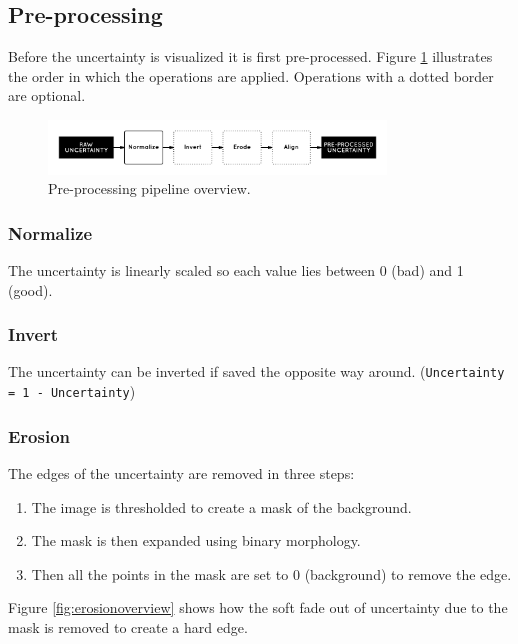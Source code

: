 \subsection{Pre-processing}\label{method:pre-processing}
Before the uncertainty is visualized it is first pre-processed. Figure \ref{fig:preprocesspipeline} illustrates the order in which the operations are applied. Operations with a dotted border are optional.

\begin{figure}[H]
  \centering
  \includegraphics[width=0.8\textwidth]{images/pre-process_pipeline.png}
  \caption{Pre-processing pipeline overview.}
  \label{fig:preprocesspipeline}
\end{figure}

\subsubsection*{Normalize}
The uncertainty is linearly scaled so each value lies between 0 (bad) and 1 (good).

\subsubsection*{Invert}
The uncertainty can be inverted if saved the opposite way around. (\texttt{Uncertainty = 1 - Uncertainty})

\subsubsection*{Erosion}
The edges of the uncertainty are removed in three steps:

\begin{enumerate}
  \item The image is thresholded to create a mask of the background.
  \item The mask is then expanded using binary morphology.
  \item Then all the points in the mask are set to 0 (background) to remove the edge.
\end{enumerate}

Figure \ref{fig:erosionoverview} shows how the soft fade out of uncertainty due to the mask is removed to create a hard edge.

